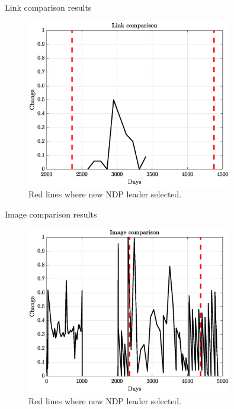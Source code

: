 \documentclass[10pt]{beamer}
\begin{document}
\begin{frame}{Link comparison results}
  \begin{figure}
    \centering
    \includegraphics[width = 0.8\textwidth]{link_comparison}
    \caption{Red lines where new NDP leader selected.}
  \end{figure}
\end{frame}

\begin{frame}{Image comparison results}
  \begin{figure}
    \centering
    \includegraphics[width = 0.8\textwidth]{image_comparison}
    \caption{Red lines where new NDP leader selected.}
  \end{figure}
\end{frame}
\end{document}
